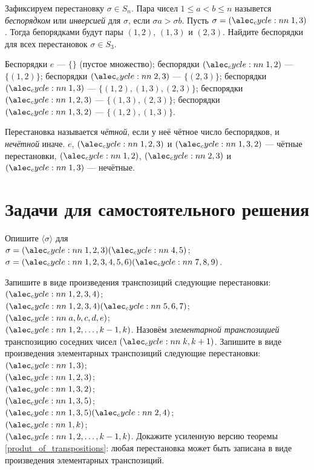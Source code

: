 \documentclass[a4paper,12pt]{article}
\begin{document}
     Зафиксируем перестановку $\sigma \in S_n$. Пара чисел $1 \leq a < b \leq n$ назывется \emph{беспорядком} или \emph{инверсией} для $\sigma$, если $\sigma a > \sigma b$.
    \example Пусть $\sigma = \cycle{1,3}$. Тогда бепорядками будут пары $(1,2)$, $(1,3)$ и $(2,3)$.
    \problem Найдите беспорядки для всех перестановок $\sigma \in S_3$.
    \begin{solution}
        Беспорядки $e$ --- $\{\}$ (пустое множество);
        беспорядки $\cycle{1,2}$ --- $\{(1,2)\}$;
        беспорядки $\cycle{2,3}$ --- $\{(2,3)\}$;
        беспорядки $\cycle{1,3}$ --- $\{(1,2), (1,3), (2,3)\}$;
        беспорядки $\cycle{1,2,3}$ --- $\{(1,3), (2,3)\}$;
        беспорядки $\cycle{1,3,2}$ --- $\{(1,2), (1,3)\}$.
    \end{solution}
    
     Перестановка называется \emph{чётной}, если у неё чётное число беспорядков, и \emph{нечётной} иначе.
    \example $e$, $\cycle{1,2,3}$ и $\cycle{1,3,2}$ --- чётные перестановки, $\cycle{1,2}$, $\cycle{2,3}$ и $\cycle{1,3}$ --- нечётные.
    
    \section{Задачи для самостоятельного решения}
    
    \problem Опишите $\langle\sigma\rangle$ для \\
    \sub $\sigma = \cycle{1,2,3}\cycle{4,5}$; \sub $\sigma = \cycle{1,2,3,4,5,6}\cycle{7,8,9}$.
    
    \problem Запишите в виде произведения транспозиций следующие перестановки: \\
    \sub $\cycle{1,2,3,4}$; \\ 
    \sub $\cycle{1,2,3,4}\cycle{5,6,7}$; \\ 
    \sub $\cycle{a,b,c,d,e}$; \\ 
    \sub $\cycle{1,2,\ldots,k-1,k}$.
     Назовём \emph{элементарной транспозицией} транспозицию соседних чисел $\cycle{k,k+1}$.
    \problem Запишите в виде произведения элементарных транспозиций следующие перестановки: \\
    \sub $\cycle{1,3}$; \\ 
    \sub $\cycle{1,2,3}$; \\ 
    \sub $\cycle{1,3,2}$; \\ 
    \sub $\cycle{1,3,5}$; \\ 
    \sub $\cycle{1,3,5}\cycle{2,4}$; \\ 
    \sub $\cycle{1,k}$; \\ 
    \sub $\cycle{1,2,\ldots,k-1,k}$.
     Докажите усиленную версию теоремы \ref{produt_of_transpositions}: любая перестановка может быть записана в виде произведения элементарных транспозиций.
    
\end{document}
